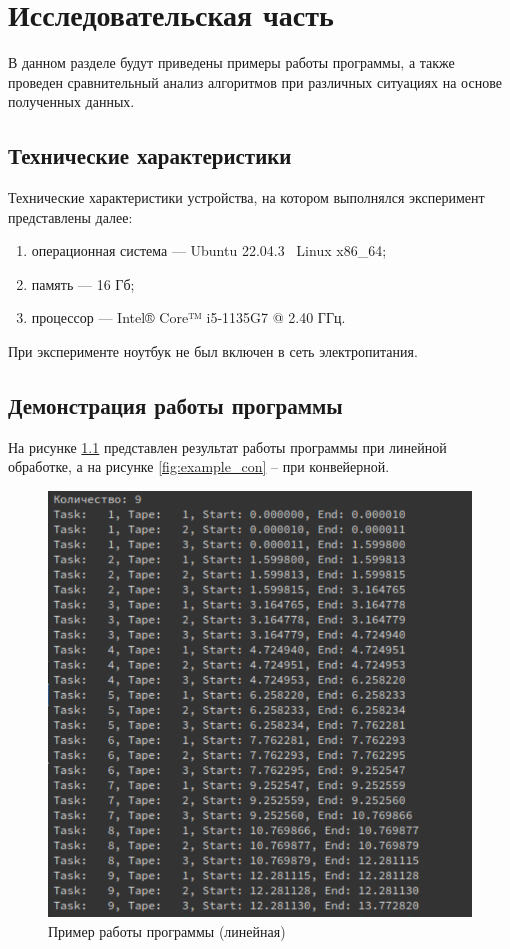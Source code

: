 \chapter{Исследовательская часть}

В данном разделе будут приведены примеры работы программы, а также проведен сравнительный анализ алгоритмов при различных ситуациях на основе полученных данных.

\section{Технические характеристики}

Технические характеристики устройства, на котором выполнялся эксперимент представлены далее:

\begin{enumerate}[label=\arabic*)]
	\item операционная система --- Ubuntu 22.04.3~\cite{ubuntu} Linux x86\_64;
	\item память --- 16 Гб;
	\item процессор --- Intel® Core™ i5-1135G7 @ 2.40 ГГц.
\end{enumerate}

При эксперименте ноутбук не был включен в сеть электропитания.

\section{Демонстрация работы программы}

На рисунке \ref{fig:example_linear} представлен результат работы программы при линейной обработке, а на рисунке \ref{fig:example_con} -- при конвейерной.

\begin{figure}[h!]
	\centering
	\includegraphics[width=0.6\linewidth]{img/example_linear}
	\caption{Пример работы программы (линейная)}
	\label{fig:example_linear}
\end{figure}

